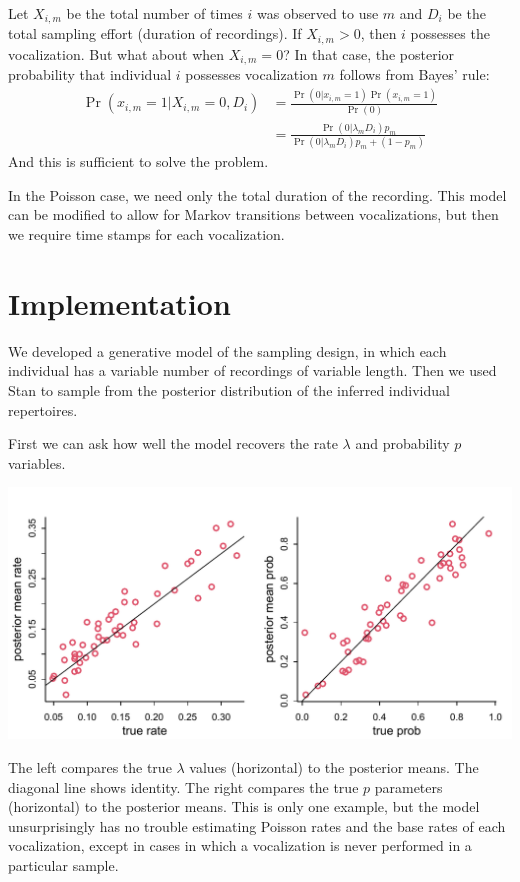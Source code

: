 \documentclass[reqno ,11pt]{amsart}
\begin{document}
Let $X_{i,m}$ be the total number of times $i$ was observed to use $m$ and $D_{i}$ be the total sampling effort (duration of recordings). If $X_{i,m}>0$, then $i$ possesses the vocalization. But what about when $X_{i,m}=0$? In that case, the posterior probability that individual $i$ possesses vocalization $m$ follows from Bayes' rule:
\begin{align*}
	\Pr(x_{i,m}=1|X_{i,m}=0,D_{i}) &= \frac{\Pr(0|x_{i,m}=1)\Pr(x_{i,m}=1)}{\Pr(0)} \\ 
	&= \frac{\Pr(0|\lambda_m D_{i})p_m}{\Pr(0|\lambda_m D_{i})p_m + (1-p_m)}
\end{align*}
And this is sufficient to solve the problem.

In the Poisson case, we need only the total duration of the recording. 
This model can be modified to allow for Markov transitions between vocalizations, but then we require time stamps for each vocalization. 

\section*{Implementation}

We developed a generative model of the sampling design, in which each individual has a variable number of recordings of variable length. Then we used Stan to sample from the posterior distribution of the inferred individual repertoires.

First we can ask how well the model recovers the rate $\lambda$ and probability $p$ variables.
\begin{center}
	\includegraphics[scale=0.6]{fig_lambda_p.pdf}
\end{center}
The left compares the true $\lambda$ values (horizontal) to the posterior means. The diagonal line shows identity. The right compares the true $p$ parameters (horizontal) to the posterior means. 
This is only one example, but the model unsurprisingly has no trouble estimating Poisson rates and the base rates of each vocalization, except in cases in which a vocalization is never performed in a particular sample.
\end{document}
